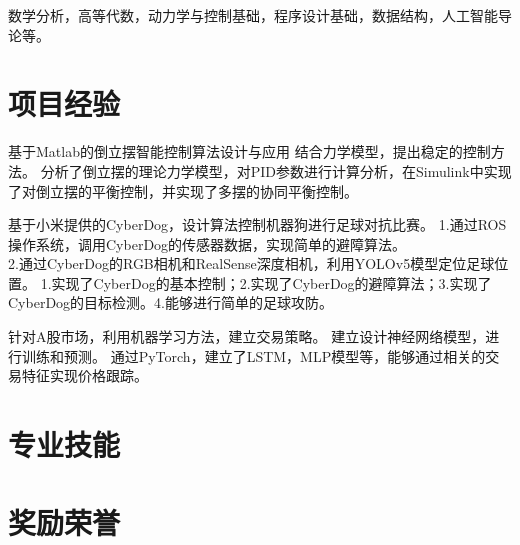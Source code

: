 \documentclass{resume}
\begin{document}
\qquad \qquad 数学分析，高等代数，动力学与控制基础，程序设计基础，数据结构，人工智能导论等。

\section{项目经验}
\Content
{基于Matlab的倒立摆智能控制算法设计与应用}
{结合力学模型，提出稳定的控制方法。}
{分析了倒立摆的理论力学模型，对PID参数进行计算分析，在Simulink中实现了对倒立摆的平衡控制，并实现了多摆的协同平衡控制。}

\Content
{基于小米提供的CyberDog，设计算法控制机器狗进行足球对抗比赛。}
{1.通过ROS操作系统，调用CyberDog的传感器数据，实现简单的避障算法。\\
2.通过CyberDog的RGB相机和RealSense深度相机，利用YOLOv5模型定位足球位置。}
{1.实现了CyberDog的基本控制；2.实现了CyberDog的避障算法；3.实现了CyberDog的目标检测。4.能够进行简单的足球攻防。}

\Content
{针对A股市场，利用机器学习方法，建立交易策略。}
{建立设计神经网络模型，进行训练和预测。}
{通过PyTorch，建立了LSTM，MLP模型等，能够通过相关的交易特征实现价格跟踪。}

\section{专业技能}
\sepspace

\section{奖励荣誉}
\end{document}
